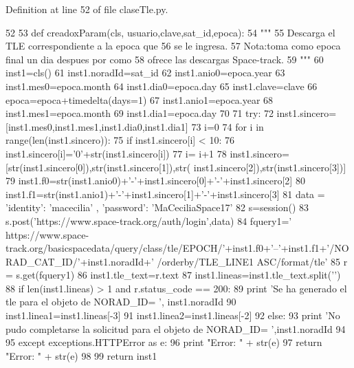 \-Definition at line 52 of file clase\-Tle.\-py.


\begin{DoxyCode}
52 
53     def creadoxParam(cls, usuario,clave,sat_id,epoca):
54         """
55         Descarga el TLE correspondiente a la epoca que
56         se le ingresa.
57         Nota:toma como epoca final un dia despues por como 
58         ofrece las descargas Space-track.
59         """
60         inst1=cls()
61         inst1.noradId=sat_id
62         inst1.anio0=epoca.year
63         inst1.mes0=epoca.month
64         inst1.dia0=epoca.day
65         inst1.clave=clave
66         epoca=epoca+timedelta(days=1)
67         inst1.anio1=epoca.year
68         inst1.mes1=epoca.month
69         inst1.dia1=epoca.day
70         
71         try:
72             inst1.sincero=[inst1.mes0,inst1.mes1,inst1.dia0,inst1.dia1]
73             i=0
74             for i in range(len(inst1.sincero)):           
75                 if inst1.sincero[i] < 10:
76                     inst1.sincero[i]='0'+str(inst1.sincero[i])
77                 i= i+1
78             inst1.sincero=[str(inst1.sincero[0]),str(inst1.sincero[1]),str(
      inst1.sincero[2]),str(inst1.sincero[3])]
79             inst1.f0=str(inst1.anio0)+'-'+inst1.sincero[0]+'-'+inst1.sincero[2]
80             inst1.f1=str(inst1.anio1)+'-'+inst1.sincero[1]+'-'+inst1.sincero[3]
81             data = {'identity': 'macecilia' , 'password': 'MaCeciliaSpace17'}
82             s=session() 
83             s.post('https://www.space-track.org/auth/login',data)
84             fquery1='
      https://www.space-track.org/basicspacedata/query/class/tle/EPOCH/'+inst1.f0+'--'+inst1.f1+'/NORAD_CAT_ID/'+inst1.noradId+'
      /orderby/TLE_LINE1 ASC/format/tle'
85             r = s.get(fquery1)
86             inst1.tle_text=r.text
87             inst1.lineas=inst1.tle_text.split('\n')
88             if len(inst1.lineas) > 1 and r.status_code == 200:
89                 print 'Se ha generado el tle para el objeto de NORAD_ID= ',
      inst1.noradId
90                 inst1.linea1=inst1.lineas[-3]
91                 inst1.linea2=inst1.lineas[-2]
92             else:
93                 print 'No pudo completarse la solicitud para el objeto de
       NORAD_ID= ',inst1.noradId                      
94     
95         except exceptions.HTTPError as e:
96             print "Error: " + str(e)
97             return "Error: " + str(e)
98 
99         return inst1
    
\end{DoxyCode}
